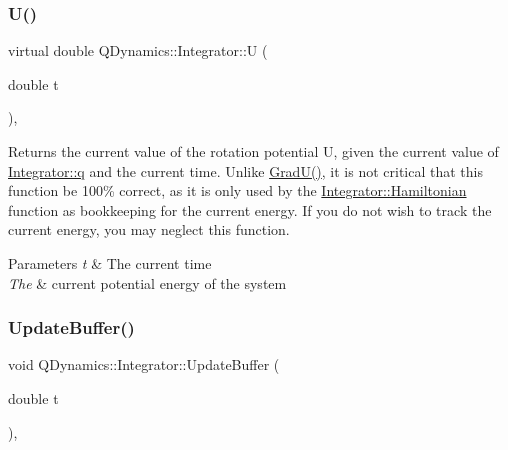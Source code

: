 \subsubsection{\texorpdfstring{U()}{U()}}
{\footnotesize\ttfamily virtual double Q\+Dynamics\+::\+Integrator\+::U (\begin{DoxyParamCaption}\item[{double}]{t }\end{DoxyParamCaption})\hspace{0.3cm}{\ttfamily [protected]}, {\ttfamily [virtual]}}



Returns the current value of the rotation potential U, given the current value of \hyperlink{classQDynamics_1_1Integrator_a5929511da076c7f31749a6da713fcff6}{Integrator\+::q} and the current time. Unlike \hyperlink{classQDynamics_1_1Integrator_a4688fbccd8b0dc5c9a73dddac66b486f}{Grad\+U()}, it is not critical that this function be 100\% correct, as it is only used by the \hyperlink{classQDynamics_1_1Integrator_a816743f6efb41b0b29243ff3bdaa4c9d}{Integrator\+::\+Hamiltonian} function as bookkeeping for the current energy. If you do not wish to track the current energy, you may neglect this function. 


\begin{DoxyParams}{Parameters}
{\em t} & The current time \\
\hline
{\em The} & current potential energy of the system \\
\hline
\end{DoxyParams}
\mbox{\label{classQDynamics_1_1Integrator_af613a42e489de2d041673fd5be0ebb61}} 
\subsubsection{\texorpdfstring{Update\+Buffer()}{UpdateBuffer()}}
{\footnotesize\ttfamily void Q\+Dynamics\+::\+Integrator\+::\+Update\+Buffer (\begin{DoxyParamCaption}\item[{double}]{t }\end{DoxyParamCaption})\hspace{0.3cm}{\ttfamily [inline]}, {\ttfamily [private]}}



